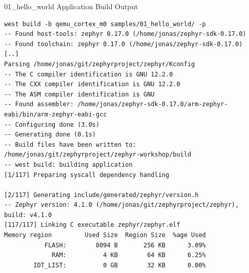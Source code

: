 \documentclass[10pt, aspectratio=169]{beamer}
\begin{document}
\begin{frame}[fragile]{01\_hello\_world Application Build Output}
  \begin{listing}[H]
    \begin{verbatim}
west build -b qemu_cortex_m0 samples/01_hello_world/ -p
-- Found host-tools: zephyr 0.17.0 (/home/jonas/zephyr-sdk-0.17.0)
-- Found toolchain: zephyr 0.17.0 (/home/jonas/zephyr-sdk-0.17.0)
[..]
Parsing /home/jonas/git/zephyrproject/zephyr/Kconfig
-- The C compiler identification is GNU 12.2.0
-- The CXX compiler identification is GNU 12.2.0
-- The ASM compiler identification is GNU
-- Found assembler: /home/jonas/zephyr-sdk-0.17.0/arm-zephyr-eabi/bin/arm-zephyr-eabi-gcc
-- Configuring done (3.0s)
-- Generating done (0.1s)
-- Build files have been written to: /home/jonas/git/zephyrproject/zephyr-workshop/build
-- west build: building application
[1/117] Preparing syscall dependency handling

[2/117] Generating include/generated/zephyr/version.h
-- Zephyr version: 4.1.0 (/home/jonas/git/zephyrproject/zephyr), build: v4.1.0
[117/117] Linking C executable zephyr/zephyr.elf
Memory region         Used Size  Region Size  %age Used
           FLASH:        8094 B       256 KB      3.09%
             RAM:          4 KB        64 KB      6.25%
        IDT_LIST:          0 GB        32 KB      0.00%
    \end{verbatim}
  \caption{\scriptsize{Console Output}}
  \end{listing}
\end{frame}
\end{document}
